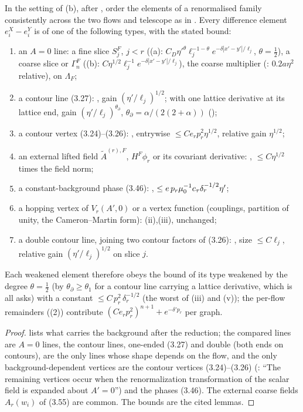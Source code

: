 \begin{proposition}\label{rot:hyb:prop:list}
In the setting of (b), after , order the elements of a renormalised family consistently across the two flows and telescope as in . Every difference element $e^X_i-e^Y_i$ is of one of the following types, with the stated bound:
\begin{enumerate}[label=\textup{(\roman*)},leftmargin=*]
\item an $A=0$ line: a fine slice $S^F_j$, $j<r$ ((a): $C_D\eta'^{\theta}\ell_j^{-1-\theta}e^{-\delta|x'-y'|/\ell_j}$, $\theta=\frac12$), a coarse slice or $\Gamma^F_n$ ((b): $C\eta^{1/2}\ell_j^{-1}e^{-\delta|x'-y'|/\ell_j}$), the coarse multiplier (: $0.2a\eta^2$ relative), on $\Lambda_F$;
\item a contour line (3.27): , gain $(\eta'/\ell_j)^{1/2}$; with one lattice derivative at its lattice end, gain $(\eta'/\ell_j)^{\theta_\partial}$, $\theta_\partial=\alpha/(2(2+\alpha))$ ();
\item a contour vertex (3.24)--(3.26): , entrywise $\le Ce_rp_r^2\eta^{1/2}$, relative gain $\eta^{1/2}$;
\item an external lifted field $\tilde A^{(r),F}$, $H^F\phi_r$ or its covariant derivative: , $\le C\eta^{1/2}$ times the field norm;
\item a constant-background phase (3.46): , $\le e\,p_r\mu_0^{-1}c_\tau\delta_r^{-1/2}\eta'$;
\item a hopping vertex of $V_r(A',0)$ or a vertex function (couplings, partition of unity, the Cameron--Martin form): (ii),(iii), unchanged;
\item a double contour line, joining two contour factors of (3.26): , size $\le C\ell_j$, relative gain $(\eta'/\ell_j)^{1/2}$ on slice $j$.
\end{enumerate}
Each weakened element therefore obeys the bound of its type weakened by the degree $\theta=\frac12$ (by $\theta_\partial\ge\theta_1$ for a contour line carrying a lattice derivative, which is all  asks) with a constant $\le C\,p_r^{2}\,\delta_r^{-1/2}$ (the worst of (iii) and (v)); the per-flow remainders ((2)) contribute $(Ce_rp_r^2)^{n+1}+e^{-\delta'p_r}$ per graph.
\end{proposition}
\begin{proof}
 lists what carries the background after the reduction; the compared lines are $A=0$ lines, the contour lines, one-ended (3.27) and double (both ends on contours), are the only lines whose shape depends on the flow, and the only background-dependent vertices are the contour vertices (3.24)--(3.26) (\cite[p.~658]{K1}: ``The remaining vertices occur when the renormalization transformation of the scalar field is expanded about $A'=0$'') and the phases (3.46). The external coarse fields $A_r(w_i)$ of (3.55) are common. The bounds are the cited lemmas.
\end{proof}

